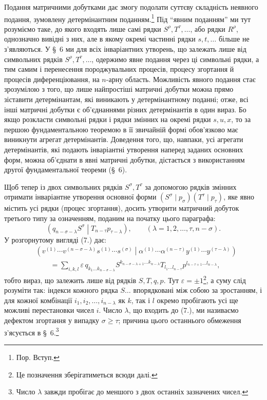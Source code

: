 \documentclass[11pt]{article}
\newcommand{\pair}[2]{\left(#1\middle|#2\right)}
\newcommand{\eps}{\varepsilon}
\begin{document}
Подання матричними добутками дає змогу подолати суттєву складність неявного подання, зумовлену детермінантним поданням.\footnote{Пор. Вступ.} Під ``явним поданням'' ми тут розуміємо таке, до якого входять лише самі рядки $S^\rho,T^\tau,\ldots$, або рядки $R^\rho$, однозначно вивідні з них, але в якому окремі частинні рядки $s,t,\ldots$ більше не з'являються. У \S\ 6 ми для всіх інваріантних утворень, що залежать лише від символьних рядків $S^\rho,T^\tau,\ldots$, одержимо явне подання через ці символьні рядки, а тим самим і перенесення породжувальних процесів, процесу згортання й процесів диференціювання, на $n$-арну область. Можливість явного подання стає зрозумілою з того, що лише найпростіші матричні добутки можна прямо зіставити детермінантам, які виникають у детермінантному поданні; отже, всі інші матричні добутки є об'єднаннями різних детермінантів в один вираз. Бо якщо розкласти символьні рядки і рядки змінних на окремі рядки $s,u,x$, то за першою фундаментальною теоремою в її звичайній формі обов'язково має виникнути агрегат детермінантів. Доведення того, що, навпаки, усі агрегати детермінантів, які подають інваріантні утворення наперед заданих основних форм, можна об'єднати в явні матричні добутки, дістається з використанням другої фундаментальної теореми (\S\ 6).

Щоб тепер із двох символьних рядків $S^\sigma,T^\tau$ за допомогою рядків змінних отримати інваріантне утворення основної форми $(S^\sigma\mid p_\sigma)(T^\tau\mid p_\tau)$, яке явно містить усі рядки (процес згортання), досить утворити матричний добуток третього типу за означенням, поданим на початку цього параграфа:
\begin{equation}
 \pair{q_{n-\sigma-\lambda}S^\sigma}{T_{n-\tau}p_{\tau-\lambda}},
 \qquad (\lambda=1,2,\ldots,\tau,n-\sigma).
\tag{7}
\end{equation}
У розгорнутому вигляді (7.) дає:
\begin{equation}
\begin{aligned}
&\pair{v^{(1)}\cdots v^{(n-\sigma-\lambda)}s^{(1)}\cdots s^{(\sigma)}}
       {\alpha^{(1)}\cdots\alpha^{(n-\tau)}y^{(1)}\cdots y^{(\tau-\lambda)}} \\
&\qquad =\sum_{i,k,l}\eps\,q_{k_1\ldots k_{n-\sigma-\lambda}}
 S^{k_{n-\sigma-\lambda+1}\ldots k_{n-\lambda}}
 T_{l_1\ldots l_{n-\tau}}
 p^{l_{n-\tau+1}\ldots l_{n-\lambda}},
\end{aligned}
\tag{8}
\end{equation}
тобто вираз, що залежить лише від рядків $S,T,q,p$. Тут $\eps=\pm1$\footnote{Це позначення зберігатиметься всюди далі.}, а суму слід розуміти так: індекси кожного рядка $S\ldots$ впорядковані між собою за зростанням, і для кожної комбінації $i_1,i_2,\ldots,i_{n-\lambda}$ як $k$, так і $l$ окремо пробігають усі ще можливі перестановки чисел $i$. Число $\lambda$, що входить до (7.), ми називаємо дефектом згортання у випадку $\sigma\geq\tau$; причина цього останнього обмеження з'ясується в \S\ 6.\footnote{Число $\lambda$ завжди пробігає до меншого з двох останніх зазначених чисел.}
\end{document}
